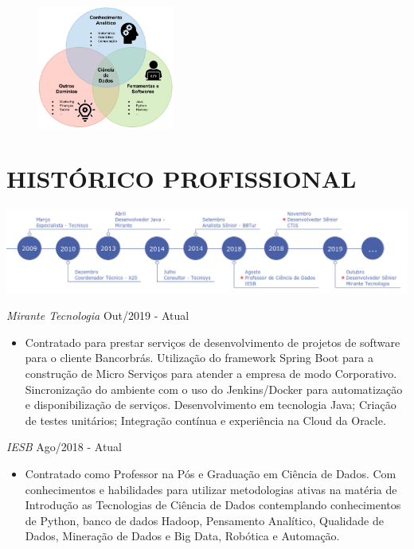 \documentclass{res}
\begin{document}
\begin{resume}
\begin{figure}[!htb]
	\centering
	\includegraphics[width=0.4\textwidth]{PosPort.png}
\end{figure}
 
\section{HISTÓRICO PROFISSIONAL} %
\vspace{8pt}
\includegraphics[width=1.0\textwidth]{experiencia.png}

{\sl Mirante Tecnologia} \hfill Out/2019 - Atual
\begin{itemize}
	\item Contratado para prestar serviços de desenvolvimento de projetos de software para o cliente Bancorbrás. Utilização do framework Spring Boot para a construção de Micro Serviços para atender a empresa de modo Corporativo. Sincronização do ambiente com o uso do Jenkins/Docker para automatização e disponibilização de serviços. Desenvolvimento em tecnologia Java; Criação de testes unitários; Integração contínua e experiência na Cloud da Oracle. 
\end{itemize}

{\sl IESB} \hfill Ago/2018 - Atual
\begin{itemize}
	\item Contratado como Professor na Pós e Graduação em Ciência de Dados. Com conhecimentos e habilidades para utilizar metodologias ativas na matéria de Introdução as Tecnologias de Ciência de Dados contemplando conhecimentos de Python, banco de dados Hadoop, Pensamento Analítico, Qualidade de Dados, Mineração de Dados e Big Data, Robótica e Automação.
\end{itemize}


\end{resume}
\end{document}
